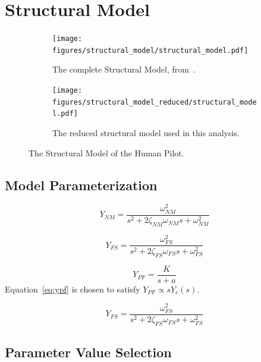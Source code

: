 \section{Structural Model}

\begin{figure}[h]
    \centering
    \begin{subfigure}[b]{0.49\textwidth}
        \centering
        \texttt{[image: figures/structural\_model/structural\_model.pdf]}
        \caption{The complete Structural Model, from~\cite{hess_unified_1997}.}
        \label{fig:structuralmodel}
    \end{subfigure}
    \hfill
    \begin{subfigure}[b]{0.49\textwidth}
        \centering
        \texttt{[image: figures/structural\_model\_reduced/structural\_model.pdf]}
        \caption{The reduced structural model used in this analysis.}
        \label{fig:structuralmodelreduced}
    \end{subfigure}
    \caption{The Structural Model of the Human Pilot.}
    \label{fig:structuralmodels}
\end{figure}

\subsection{Model Parameterization}
\begin{equation}
Y_{NM} = \frac{\omega^2_{NM}}{s^2 + 2 \zeta_{NM} \omega_{NM} s + \omega^2_{NM}}
\end{equation}

\begin{equation}
Y_{FS} = \frac{\omega^2_{FS}}{s^2 + 2 \zeta_{FS} \omega_{FS} s + \omega^2_{FS}}
\end{equation}

\begin{equation} \label{eq:ypf}
Y_{PF} = \frac{K}{s+a}
\end{equation}
Equation~\ref{eq:ypf} is chosen to satisfy $Y_{PF} \propto s Y_c (s)$.

\begin{equation}
Y_{FS} = \frac{\omega^2_{FS}}{s^2 + 2 \zeta_{FS} \omega_{FS} s + \omega^2_{FS}}
\end{equation}

\subsection{Parameter Value Selection}

